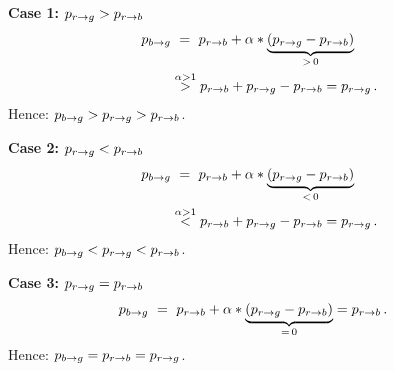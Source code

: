 \documentclass[%
 draft,
 aapm,
 mph,%
 amsmath,amssymb,
 reprint,%
]{revtex4-2}
\begin{document}
\vspace{.2cm}
\noindent\textbf{Case 1: $\prg > \prb$}
\begin{align}
    \prbg &~=~ \prb + \alpha * \underbrace{(\prg - \prb)}_{>\,0} \\
            & \overset{\alpha>1}{>} \prb + \prg - \prb = \prg \punc.
\end{align}
Hence: $\prbg > \prg > \prb$.

\vspace{.2cm}
\noindent\textbf{Case 2: $\prg < \prb$}
\begin{align}
    \prbg &~=~ \prb + \alpha * \underbrace{(\prg - \prb)}_{<\,0} \\
            & \overset{\alpha>1}{<} \prb + \prg - \prb = \prg \punc.
\end{align}
Hence: $\prbg < \prg < \prb$.

\vspace{.2cm}
\noindent\textbf{Case 3: $\prg = \prb$}
\begin{align}
    \prbg &~=~ \prb + \alpha * \underbrace{(\prg - \prb)}_{=\,0} = \prb\punc.
\end{align}
Hence: $\prbg = \prb = \prg$.
\end{document}
